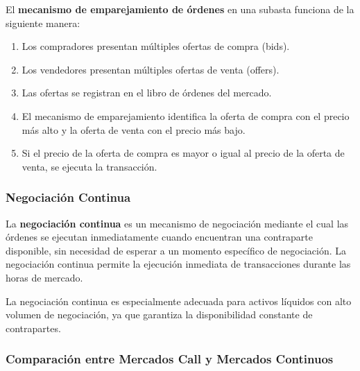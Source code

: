\begin{definicion}
El \textbf{mecanismo de emparejamiento de órdenes} en una subasta funciona de la siguiente manera:
\begin{enumerate}
\item Los compradores presentan múltiples ofertas de compra (bids).
\item Los vendedores presentan múltiples ofertas de venta (offers).
\item Las ofertas se registran en el libro de órdenes del mercado.
\item El mecanismo de emparejamiento identifica la oferta de compra con el precio más alto y la oferta de venta con el precio más bajo.
\item Si el precio de la oferta de compra es mayor o igual al precio de la oferta de venta, se ejecuta la transacción.
\end{enumerate}
\end{definicion}

\subsubsection{Negociación Continua}

\begin{definicion}
La \textbf{negociación continua} es un mecanismo de negociación mediante el cual las órdenes se ejecutan inmediatamente cuando encuentran una contraparte disponible, sin necesidad de esperar a un momento específico de negociación. La negociación continua permite la ejecución inmediata de transacciones durante las horas de mercado.
\end{definicion}

La negociación continua es especialmente adecuada para activos líquidos con alto volumen de negociación, ya que garantiza la disponibilidad constante de contrapartes.

\subsubsection{Comparación entre Mercados Call y Mercados Continuos}

